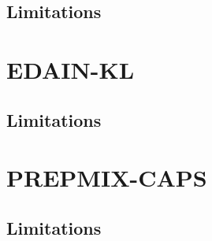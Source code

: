 \documentclass{statsmsc}
\begin{document}
{%

\subsection{Limitations}%
\label{sub:Limitations}




\section{EDAIN-KL}%
\label{sec:EDAIN-KL-discuss}




\subsection{Limitations}%
\label{sub:Limitations}



\section{PREPMIX-CAPS}%
\label{sec:PREPMIX-CAPS}


\subsection{Limitations}%
\label{sub:Limitations}


}
\end{document}
